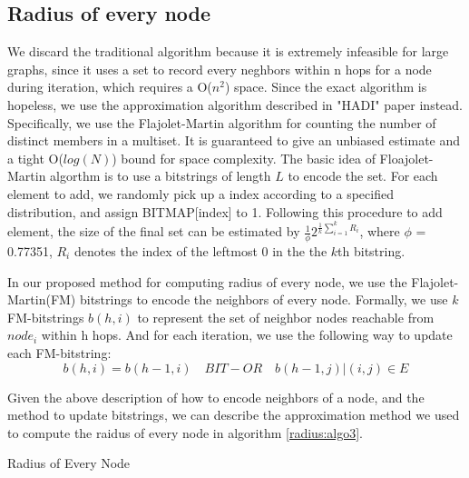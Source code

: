 \subsection{Radius of every node}
We discard the traditional algorithm because it is extremely infeasible for large graphs, since it uses a set to record every neghbors within n hops for a node during iteration, which requires a O($n^2$) space.
Since the exact algorithm is hopeless, we use the approximation algorithm described in "HADI" paper\cite{DBLP:journals/tkdd/KangTAFL11} instead. Specifically, we use the Flajolet-Martin algorithm for counting the number of distinct members in a multiset. It is guaranteed to give an unbiased estimate and a tight O($log(N)$) bound for space complexity. The basic idea of Floajolet-Martin algorthm is to use a bitstrings of length $L$ to encode the set. For each element to add, we randomly pick up a index according to a specified distribution, and assign BITMAP[index] to 1. Following this procedure to add element, the size of the final set can be estimated by $\frac{1}{\phi} 2^{\frac{1}{k}\sum_{i=1}^k R_i}$, where $\phi$ = 0.77351, $R_i$ denotes the index of the leftmost 0 in the the $k$th bitstring.

In our proposed method for computing radius of every node, we use the Flajolet-Martin(FM) bitstrings to encode the neighbors of every node. Formally, we use $k$ FM-bitstrings $b(h, i)$ to represent the set of neighbor nodes reachable from $node_i$ within h hops. And for each iteration, we use the following way to update each FM-bitstring:$$b(h,i) = b(h-1,i)  \quad BIT-OR \quad  {b(h-1,j)|(i,j)\in E}$$

Given the above description of how to encode neighbors of a node, and the method to update bitstrings, we can describe the approximation method we used to compute the raidus of every node in algorithm \ref{radius:algo3}.

\begin{algorithm}
\caption{Radius of Every Node}
\begin{algorithmic}
\REPEAT
{}
\end{algorithmic}
\label{radius:algo3}
\end{algorithm}

